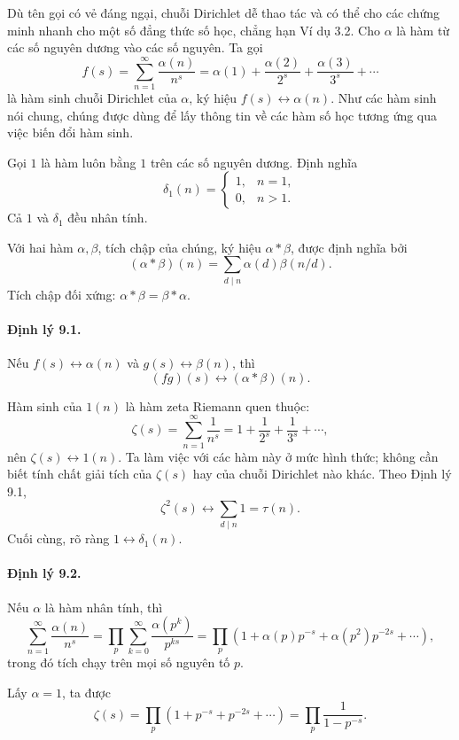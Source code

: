 \documentclass[11pt]{article}
\begin{document}
Dù tên gọi có vẻ đáng ngại, chuỗi Dirichlet dễ thao tác và có thể cho các
chứng minh nhanh cho một số đẳng thức số học, chẳng hạn Ví dụ 3.2. Cho
\(\alpha\) là hàm từ các số nguyên dương vào các số nguyên. Ta gọi
\[
 f(s)=\sum_{n=1}^{\infty}\frac{\alpha(n)}{n^s}
 =\alpha(1)+\frac{\alpha(2)}{2^s}+\frac{\alpha(3)}{3^s}+\cdots
\]
là hàm sinh chuỗi Dirichlet của \(\alpha\), ký hiệu \(f(s)\leftrightarrow
\alpha(n)\). Như các hàm sinh nói chung, chúng được dùng để lấy thông tin về
các hàm số học tương ứng qua việc biến đổi hàm sinh.

Gọi \(1\) là hàm luôn bằng \(1\) trên các số nguyên dương. Định nghĩa
\[
\delta_1(n)=
\begin{cases}
1,&n=1,\\
0,&n>1.
\end{cases}
\]
Cả \(1\) và \(\delta_1\) đều nhân tính.

Với hai hàm \(\alpha,\beta\), tích chập của chúng, ký hiệu \(\alpha*\beta\),
được định nghĩa bởi
\[
 (\alpha*\beta)(n)=\sum_{d\mid n}\alpha(d)\beta(n/d).
\]
Tích chập đối xứng: \(\alpha*\beta=\beta*\alpha\).

\paragraph{Định lý 9.1.}
Nếu \(f(s)\leftrightarrow\alpha(n)\) và \(g(s)\leftrightarrow\beta(n)\), thì
\[
 (fg)(s)\leftrightarrow(\alpha*\beta)(n).
\]

Hàm sinh của \(1(n)\) là hàm zeta Riemann quen thuộc:
\[
 \zeta(s)=\sum_{n=1}^{\infty}\frac1{n^s}=1+\frac1{2^s}+\frac1{3^s}+\cdots,
\]
nên \(\zeta(s)\leftrightarrow1(n)\). Ta làm việc với các hàm này ở mức hình
thức; không cần biết tính chất giải tích của \(\zeta(s)\) hay của chuỗi
Dirichlet nào khác. Theo Định lý 9.1,
\[
 \zeta^2(s)\leftrightarrow \sum_{d\mid n}1=\tau(n).
\]
Cuối cùng, rõ ràng \(1\leftrightarrow\delta_1(n)\).

\paragraph{Định lý 9.2.}
Nếu \(\alpha\) là hàm nhân tính, thì
\[
 \sum_{n=1}^{\infty}\frac{\alpha(n)}{n^s}
 =
 \prod_p\sum_{k=0}^{\infty}\frac{\alpha(p^k)}{p^{ks}}
 =
 \prod_p\left(1+\alpha(p)p^{-s}+\alpha(p^2)p^{-2s}+\cdots\right),
\]
trong đó tích chạy trên mọi số nguyên tố \(p\).

Lấy \(\alpha=1\), ta được
\[
 \zeta(s)=\prod_p(1+p^{-s}+p^{-2s}+\cdots)
 =\prod_p\frac1{1-p^{-s}}.
\]
\end{document}
